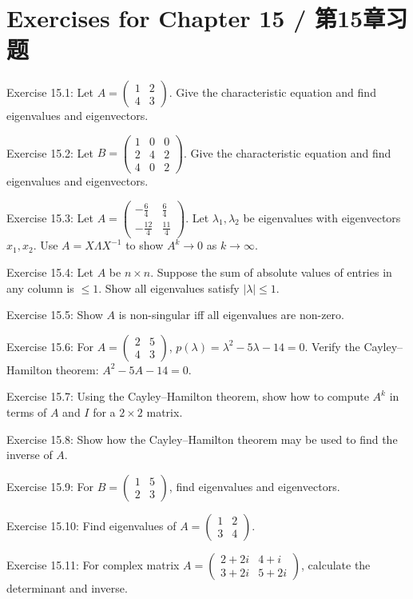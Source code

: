 \section*{Exercises for Chapter 15 / 第15章习题}

\begin{original}
Exercise 15.1: Let $A = \begin{pmatrix} 1 & 2 \\ 4 & 3 \end{pmatrix}$. Give the characteristic equation and find eigenvalues and eigenvectors.

Exercise 15.2: Let $B = \begin{pmatrix} 1 & 0 & 0 \\ 2 & 4 & 2 \\ 4 & 0 & 2 \end{pmatrix}$. Give the characteristic equation and find eigenvalues and eigenvectors.

Exercise 15.3: Let $A = \begin{pmatrix} -\frac{6}{4} & \frac{6}{4} \\ -\frac{12}{4} & \frac{11}{4} \end{pmatrix}$. Let $\lambda_1, \lambda_2$ be eigenvalues with eigenvectors $x_1, x_2$. Use $A = X\Lambda X^{-1}$ to show $A^k \to 0$ as $k \to \infty$.

Exercise 15.4: Let $A$ be $n \times n$. Suppose the sum of absolute values of entries in any column is $\le 1$. Show all eigenvalues satisfy $|\lambda| \le 1$.

Exercise 15.5: Show $A$ is non-singular iff all eigenvalues are non-zero.

Exercise 15.6: For $A = \begin{pmatrix} 2 & 5 \\ 4 & 3 \end{pmatrix}$, $p(\lambda) = \lambda^2 - 5\lambda - 14 = 0$. Verify the Cayley--Hamilton theorem: $A^2 - 5A - 14 = 0$.

Exercise 15.7: Using the Cayley--Hamilton theorem, show how to compute $A^k$ in terms of $A$ and $I$ for a $2 \times 2$ matrix.

Exercise 15.8: Show how the Cayley--Hamilton theorem may be used to find the inverse of $A$.

Exercise 15.9: For $B = \begin{pmatrix} 1 & 5 \\ 2 & 3 \end{pmatrix}$, find eigenvalues and eigenvectors.

Exercise 15.10: Find eigenvalues of $A = \begin{pmatrix} 1 & 2 \\ 3 & 4 \end{pmatrix}$.

Exercise 15.11: For complex matrix $A = \begin{pmatrix} 2+2i & 4+i \\ 3+2i & 5+2i \end{pmatrix}$, calculate the determinant and inverse.
\end{original}
